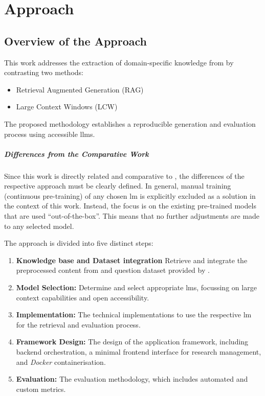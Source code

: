 
\chapter{Approach}\label{ch:approach}

\section{Overview of the Approach}\label{sec:approach_overview}

This work addresses the extraction of domain-specific knowledge from \citet{bb2} by contrasting two methods:
\begin{itemize}
    \item Retrieval Augmented Generation (RAG)
    \item Large Context Windows (LCW)
\end{itemize}
The proposed methodology establishes a reproducible generation and evaluation process using accessible \acp{llm}.
\paragraph{Differences from the Comparative Work}
Since this work is directly related and comparative to \citet{Paul_Keller}, the differences of the respective approach must be clearly defined.
In general, manual training (continuous pre-training) of any chosen \ac{lm} is explicitly excluded as a solution in the context of this work.
Instead, the focus is on the existing pre-trained models that are used \enquote{out-of-the-box}.
This means that no further adjustments are made to any selected model.
%

%
The approach is divided into five distinct steps:
\begin{enumerate}
    \item \textbf{Knowledge base and Dataset integration} Retrieve and integrate the preprocessed content from \citet{bb2} and question dataset provided by \citet{Paul_Keller}.
    \item \textbf{Model Selection:} Determine and select appropriate \acp{lm}, focussing on large context capabilities and open accessibility.
    \item \textbf{Implementation:} The technical implementations to use the respective \ac{lm} for the retrieval and evaluation process.
    \item \textbf{Framework Design:} The design of the application framework, including backend orchestration, a minimal frontend interface for research management, and \textit{Docker} containerisation.
    \item \textbf{Evaluation:} The evaluation methodology, which includes automated and custom metrics.
\end{enumerate}
%
